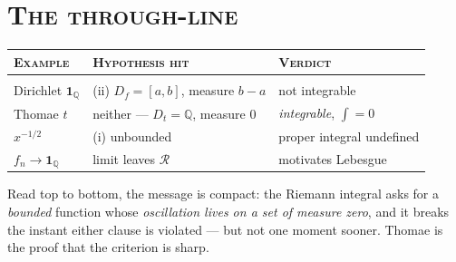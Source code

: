\documentclass[11pt]{article}
\theoremstyle{atlas}
\newcommand{\Q}{\mathbb{Q}}
\newcommand{\Rint}{\mathcal{R}}
\begin{document}
\section*{\scshape The through-line}

\begin{center}
\begin{tabular}{@{}lll@{}}
\textsc{Example} & \textsc{Hypothesis hit} & \textsc{Verdict}\\[2pt]
\hline\\[-8pt]
Dirichlet $\mathbf 1_\Q$ & (ii) $D_f=[a,b]$, measure $b-a$ & not integrable\\
Thomae $t$ & neither --- $D_t=\Q$, measure $0$ & \emph{integrable}, $\int=0$\\
$x^{-1/2}$ & (i) unbounded & proper integral undefined\\
$f_n\to\mathbf 1_\Q$ & limit leaves $\Rint$ & motivates Lebesgue\\
\end{tabular}
\end{center}

Read top to bottom, the message is compact: the Riemann integral asks for a
\emph{bounded} function whose \emph{oscillation lives on a set of measure zero}, and it
breaks the instant either clause is violated --- but not one moment sooner. Thomae is
the proof that the criterion is sharp.
\end{document}
